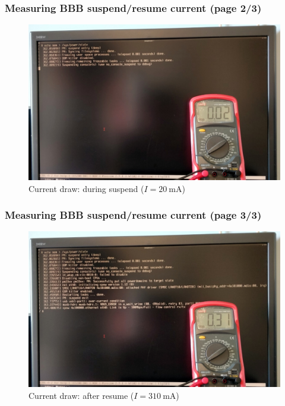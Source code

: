 \begin{frame}
  \frametitle{Measuring BBB suspend/resume current (page 2/3)}
  \begin{figure}
    \centering
    \includegraphics[scale=0.28]{images/multimeter-demo-2.jpg}
    \caption{Current draw: during suspend ($ I = \SI{20}{\mA} $)}
  \end{figure}
  \vspace*{-5mm}
\end{frame}

\begin{frame}
  \frametitle{Measuring BBB suspend/resume current (page 3/3)}
  \begin{figure}
    \centering
    \includegraphics[scale=0.28]{images/multimeter-demo-3.jpg}
    \caption{Current draw: after resume ($ I = \SI{310}{\mA} $)}
  \end{figure}
  \vspace*{-5mm}
\end{frame}

